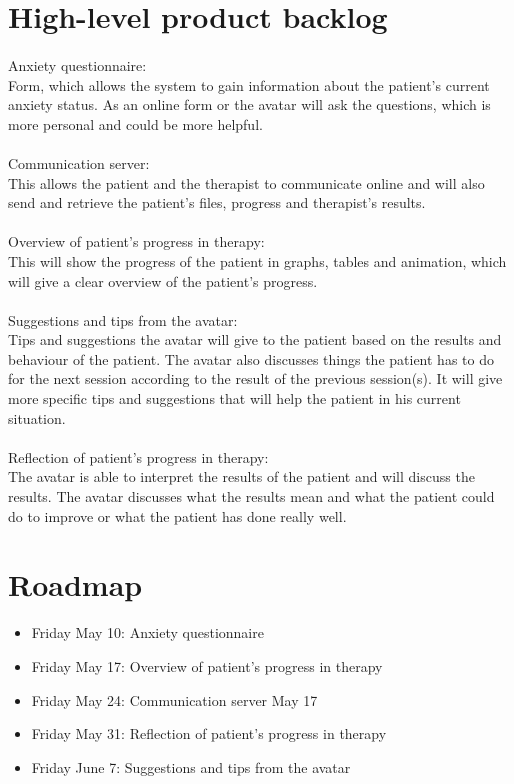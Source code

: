 \section{High-level product backlog}
\paragraph{}
Anxiety questionnaire: \\
Form, which allows the system to gain information about the patient's current anxiety status. As an online form or the \gls{avatar} will ask the questions, which is more personal and could be more helpful.
\paragraph{}
Communication server: \\
This allows the patient and the therapist to communicate online and will also send and retrieve the patient's files, progress and therapist's results.
\paragraph{}
Overview of patient's progress in therapy: \\
This will show the progress of the patient in graphs, tables and animation, which will give a clear overview of the patient's progress. 
\paragraph{}
Suggestions and tips from the \gls{avatar}: \\
Tips and suggestions the \gls{avatar} will give to the patient based on the results and behaviour of the patient. 
The \gls{avatar} also discusses things the patient has to do for the next session according to the result of the previous session(s). It will give more specific tips and suggestions that will help the patient in his current situation.
\paragraph{}
Reflection of patient's progress in therapy: \\
The \gls{avatar} is able to interpret the results of the patient and will discuss the results. The \gls{avatar} discusses what the results mean and what the patient could do to improve or what the patient has done really well.

\section{Roadmap}
\begin{itemize}
\item Friday May 10: Anxiety questionnaire
\item Friday May 17: Overview of patient's progress in therapy
\item Friday May 24: Communication server May 17
\item Friday May 31: Reflection of patient's progress in therapy
\item Friday June 7: Suggestions and tips from the \gls{avatar}
\end{itemize}
